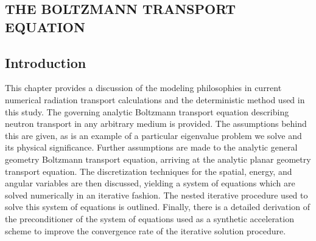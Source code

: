 
\begin{center}
\section{THE BOLTZMANN TRANSPORT EQUATION}
\label{sec:Transport}
\end{center}

\aboveSubSecSkip

\subsection{Introduction}
\label{sec:Transport-Intro}

\noindent
	\indent This chapter provides a discussion of the modeling philosophies in current 
	numerical radiation transport calculations and the deterministic method used in this study.
	The governing analytic Boltzmann transport equation describing neutron transport in 
	any arbitrary medium is provided.  The assumptions behind this are given, as is an example
	of a particular eigenvalue problem we solve and its physical significance.
	Further assumptions are made to the analytic general geometry Boltzmann transport equation,
	arriving at the analytic planar geometry transport equation.  The discretization techniques for
	the spatial, energy, and angular variables are then discussed, yielding a system of equations
	which are solved numerically in an iterative fashion.  The nested iterative procedure used
	to solve this system of equations is outlined.  Finally, there is a detailed derivation
	of the preconditioner of the system of equations used as a synthetic acceleration scheme to
	improve the convergence rate of the iterative solution procedure.
			
\belowSubSecSkip

